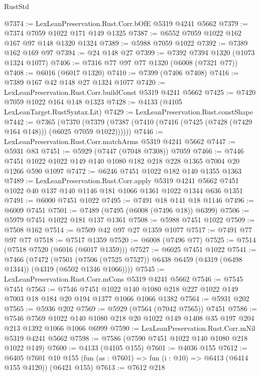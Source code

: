 \begin{lexlean}{RustStd}
\begin{coremodule}
@7374 := LexLeanPreservation.Rust.Corr.bOfE @5319 @4241 @5662
@7379 := @7374 @7059 @1022 @171 @149 @1325
@7387 := @6552 @7059 @1022 @162 @167 @97 @148 @1320 @1324
@7389 := @5988 @7059 @1022
@7392 := @7389 @162 @169 @97
@7394 := @24 @148 @27
@7399 := @7392 @7394 @1320 (@1073 @1324 @1077)
@7406 := @7316 @77 @97 @77 @1320 (@6008 (@7321 @77))
@7408 := @6016 (@6017 @1320)
@7410 := @7399 (@7406 @7408)
@7416 := @7389 @167 @42 @148 @27 @1324 @1077
@7420 := LexLeanPreservation.Rust.Corr.buildConst @5319 @4241 @5662
@7425 := @7420 @7059 @1022 @164 @148 @1323
@7428 := @4133 (@4105 LexLeanTarget.RustSyntax.Lit)
@7429 := LexLeanPreservation.Rust.constShape
@7442 := @7365
    (@7370 (@7379 (@7387 (@7410 (@7416 (@7425 (@7428 (@7429 @164 @148))) (@6025 @7059 @1022))))))
@7446 := LexLeanPreservation.Rust.Corr.matchArms @5319 @4241 @5662
@7447 := @5931 @83
@7451 := @5929 (@7447 (@7048 @7308)) @7059
@7466 := @7446 @7451 @1022 @1022 @149 @140 @1080 @182 @218 @228 @1365 @7004 @20 @1266 @590 @1097
@7472 := @6246 @7451 @1022 @182 @140 @1355 @1363
@7489 := LexLeanPreservation.Rust.Corr.apply
    @5319
    @4241
    @5662
    @7451
    @1022
    @40
    @137
    @140
    @1146
    @181
    @1066
    @1361
    @1022
    @1344
    @636
    @1351
@7491 := @6000 @7451 @1022
@7495 := @7491 @18 @141 @18 @1146
@7496 := @6009 @7451
@7501 := @7489 (@7495 (@6008 (@7496 @18)) @6399)
@7506 := @5979 @7451 @1022 @181 @137 @1361
@7508 := @5988 @7451 @1022
@7509 := @7508 @162
@7514 := @7509 @42 @97 @27 @1359 @1077
@7517 := @7491 @77 @97 @77
@7518 := @7517 @1359
@7520 := @6008 (@7496 @77)
@7525 := @7514 (@7518 @7520 (@6016 (@6017 @1359)))
@7527 := @6025 @7451 @1022
@7541 := @7466
    (@7472
      (@7501 (@7506 (@7525 @7527)) @6438 @6459 (@4319 (@6498 @1344)) (@4319 (@6502 @1346 @1066))))
@7545 := LexLeanPreservation.Rust.Corr.mCons @5319 @4241 @5662
@7546 := @7545 @7451
@7563 := @7546
    @7451
    @1022
    @140
    @1080
    @218
    @227
    @1022
    @149
    @7003
    @18
    @184
    @20
    @194
    @1377
    @1066
    @1066
    @1382
@7564 := @5931 @202
@7565 := @5936 @202
@7569 := @5929 (@7564 (@7042 @7565)) @7451
@7586 := @7546
    @7569
    @1022
    @140
    @1080
    @218
    @20
    @1022
    @149
    @1408
    @35
    @197
    @204
    @213
    @1392
    @1066
    @1066
    @6999
@7590 := LexLeanPreservation.Rust.Corr.mNil @5319 @4241 @5662
@7598 := @7586 (@7590 @7451 @1022 @140 @1080 @218 @1022 @149)
@7600 := @4133 (@4105 @155)
@7601 := @4036 @155
@7612 := @6405
    @7601
    @10
    @155
    (fun (as : @7601) => fun (i : @10) => @6413 (@6414 @155 @4120))
    (@6421 @155)
@7613 := @7612 @218

\end{coremodule}
\end{lexlean}
